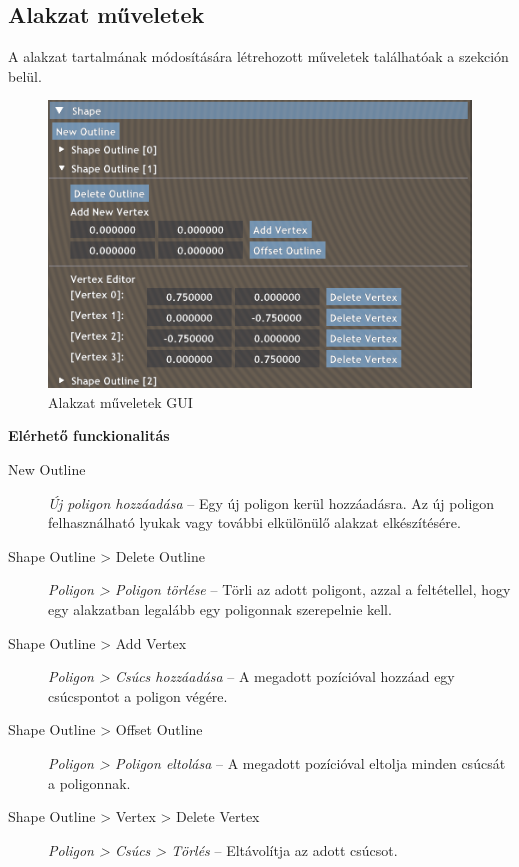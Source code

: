 \subsection{Alakzat műveletek}

A alakzat tartalmának módosítására létrehozott műveletek találhatóak a szekción belül.

\begin{figure}[H]
    \centering
    \includegraphics[width=0.85\linewidth]{images/shape_actions.png}
    \caption{Alakzat műveletek GUI}
    \label{fig:shape_actions-1}
\end{figure}

\textbf{Elérhető funckionalitás}

\begin{description}
    \item[New Outline] \textit{Új poligon hozzáadása} -- Egy új poligon kerül hozzáadásra. Az új poligon felhasználható lyukak vagy további elkülönülő alakzat elkészítésére.
    \item[Shape Outline > Delete Outline] \textit{Poligon > Poligon törlése} -- Törli az adott poligont, azzal a feltétellel, hogy egy alakzatban legalább egy poligonnak szerepelnie kell.
    \item[Shape Outline > Add Vertex] \textit{Poligon > Csúcs hozzáadása} -- A megadott pozícióval hozzáad egy csúcspontot a poligon végére.
    \item[Shape Outline > Offset Outline] \textit{Poligon > Poligon eltolása} -- A megadott pozícióval eltolja minden csúcsát a poligonnak.
    \item[Shape Outline > Vertex > Delete Vertex] \textit{Poligon > Csúcs > Törlés} -- Eltávolítja az adott csúcsot.
\end{description}

